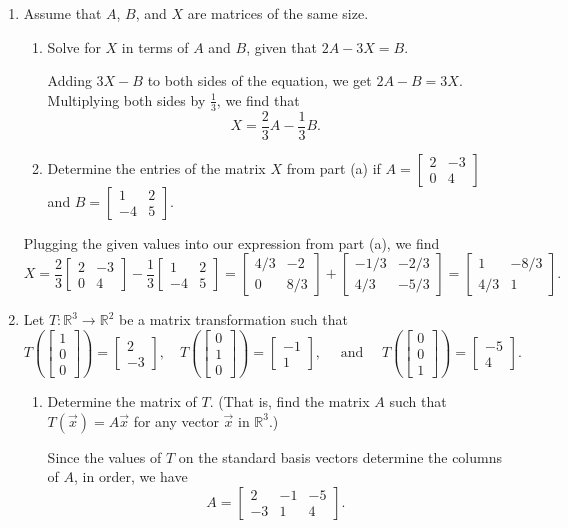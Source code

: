 \documentclass[12pt]{article}
\newcommand{\points}[1]{\marginpar{\hspace{24pt}[#1]}}
\newcommand{\R}{\mathbb{R}}
\newcommand{\bbm}{\begin{bmatrix}}
\newcommand{\ebm}{\end{bmatrix}}
\begin{document}
\begin{enumerate}
\item Assume that $A$, $B$, and $X$ are matrices of the same size.
\begin{enumerate}
 \item Solve for $X$ in terms of $A$ and $B$, given that $2A-3X=B$.\points{3}

\bigskip

Adding $3X-B$ to both sides of the equation, we get $2A-B = 3X$. Multiplying both sides by $\frac{1}{3}$, we find that
\[
 X = \frac{2}{3}A-\frac{1}{3}B.
\]

\medskip

 \item Determine the entries of the matrix $X$ from part (a) if $A=\bbm 2&-3\\0&4\ebm$ and $B=\bbm 1&2\\-4&5\ebm$.\points{3}
\end{enumerate}

\bigskip

Plugging the given values into our expression from part (a), we find 
\[
 X = \frac{2}{3}\bbm 2&-3\\0&4\ebm-\frac{1}{3}\bbm 1&2\\-4&5\ebm = \bbm 4/3 & -2\\0&8/3\ebm+\bbm -1/3 & -2/3\\4/3 & -5/3\ebm = \bbm 1 & -8/3\\4/3 & 1\ebm.
\]

\medskip

\item Let $T:\R^3\to \R^2$ be a matrix transformation such that
\[
 T\left(\bbm 1\\0\\0\ebm\right) = \bbm 2\\-3\ebm,\quad T\left(\bbm 0\\1\\0\ebm\right) = \bbm -1\\1\ebm, \quad \text{ and } \quad T\left(\bbm 0\\0\\1\ebm\right) = \bbm -5\\4\ebm.
\]
\begin{enumerate}
 \item Determine the matrix of $T$. (That is, find the matrix $A$ such that $T(\vec{x})=A\vec{x}$ for any vector $\vec{x}$ in $\R^3$.) \points{3}

\bigskip

Since the values of $T$ on the standard basis vectors determine the columns of $A$, in order, we have
\[
 A = \bbm 2&-1&-5\\-3&1&4\ebm.
\]


\end{enumerate}
\end{enumerate}
\end{document}
